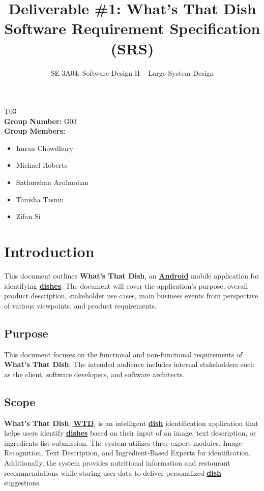 \documentclass[]{article}
\title{Deliverable \#1: What’s That Dish Software Requirement Specification (SRS)}
\author{SE 3A04: Software Design II -- Large System Design}
\date{}
\begin{document}
\maketitle	
{} T03\\
{\bf Group Number:} G03 \\
{\bf Group Members:} 
\begin{itemize}
	\item Imran Chowdhury
	\item Michael Roberts
	\item Sathurshan Arulmohan
	\item Tanisha Tasnin
	\item Zifan Si
\end{itemize}

\newpage
\section{Introduction}
\label{sec:introduction}

This document outlines \textbf{What's That Dish}, an \hyperref[Android]{\textbf{Android}} mobile application for identifying \hyperref[Dish]{\textbf{dishes}}. The document will cover the application's purpose, overall product description, stakeholder use cases, main business events from perspective of various viewpoints, and product requirements.


\subsection{Purpose}
\label{sub:purpose}
This document focuses on the functional and non-functional requirements of \textbf{What's That Dish}. The intended audience includes internal stakeholders such as the client, software developers, and software architects.

\subsection{Scope}
\label{sub:scope}
\textbf{What’s That Dish}, \hyperref[WTD]{\textbf{WTD}}, is an intelligent \hyperref[Dish]{\textbf{dish}} identification application that helps users identify \hyperref[Dish]{\textbf{dishes}} based on their input of an image, text description, or ingredients list submission. The system utilizes three expert modules, Image Recognition, Text Description, and Ingredient-Based Experts for identification. Additionally, the system provides nutritional information and restaurant recommendations while storing user data to deliver personalized \hyperref[Dish]{\textbf{dish}} suggestions.
\end{document}
